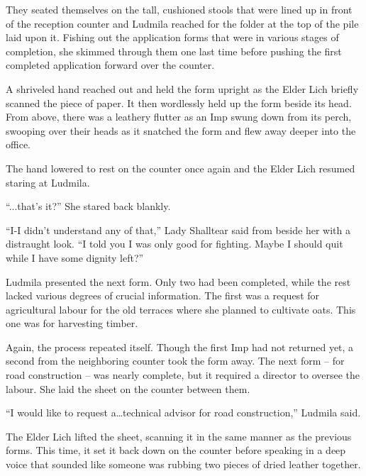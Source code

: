  

They seated themselves on the tall, cushioned stools that were lined up in front of the reception counter and Ludmila reached for the folder at the top of the pile laid upon it. Fishing out the application forms that were in various stages of completion, she skimmed through them one last time before pushing the first completed application forward over the counter.

 

A shriveled hand reached out and held the form upright as the Elder Lich briefly scanned the piece of paper. It then wordlessly held up the form beside its head. From above, there was a leathery flutter as an Imp swung down from its perch, swooping over their heads as it snatched the form and flew away deeper into the office.

 

The hand lowered to rest on the counter once again and the Elder Lich resumed staring at Ludmila.

 

“...that’s it?” She stared back blankly.

 

“I-I didn’t understand any of that,” Lady Shalltear said from beside her with a distraught look. “I told you I was only good for fighting. Maybe I should quit while I have some dignity left?”

 

Ludmila presented the next form. Only two had been completed, while the rest lacked various degrees of crucial information. The first was a request for agricultural labour for the old terraces where she planned to cultivate oats. This one was for harvesting timber.

 

Again, the process repeated itself. Though the first Imp had not returned yet, a second from the neighboring counter took the form away. The next form – for road construction – was nearly complete, but it required a director to oversee the labour. She laid the sheet on the counter between them.

 

“I would like to request a…technical advisor for road construction,” Ludmila said.

 

The Elder Lich lifted the sheet, scanning it in the same manner as the previous forms. This time, it set it back down on the counter before speaking in a deep voice that sounded like someone was rubbing two pieces of dried leather together.

